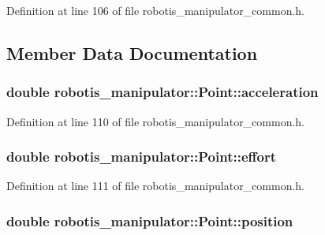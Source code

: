 Definition at line 106 of file robotis\+\_\+manipulator\+\_\+common.\+h.



\subsection{Member Data Documentation}
\subsubsection[{\texorpdfstring{acceleration}{acceleration}}]{\setlength{\rightskip}{0pt plus 5cm}double robotis\+\_\+manipulator\+::\+Point\+::acceleration}\hypertarget{structrobotis__manipulator_1_1_point_adb49f1fbcc0eaa7f530c54fdf0ede836}{}\label{structrobotis__manipulator_1_1_point_adb49f1fbcc0eaa7f530c54fdf0ede836}


Definition at line 110 of file robotis\+\_\+manipulator\+\_\+common.\+h.

\subsubsection[{\texorpdfstring{effort}{effort}}]{\setlength{\rightskip}{0pt plus 5cm}double robotis\+\_\+manipulator\+::\+Point\+::effort}\hypertarget{structrobotis__manipulator_1_1_point_add1a7019fc87cc2ac9bdf033372a9bb6}{}\label{structrobotis__manipulator_1_1_point_add1a7019fc87cc2ac9bdf033372a9bb6}


Definition at line 111 of file robotis\+\_\+manipulator\+\_\+common.\+h.

\subsubsection[{\texorpdfstring{position}{position}}]{\setlength{\rightskip}{0pt plus 5cm}double robotis\+\_\+manipulator\+::\+Point\+::position}\hypertarget{structrobotis__manipulator_1_1_point_a0f122386b502d9b316bdead542ed2145}{}\label{structrobotis__manipulator_1_1_point_a0f122386b502d9b316bdead542ed2145}


